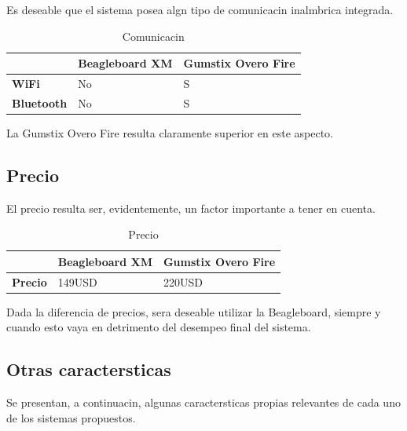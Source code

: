 \documentclass[spanish,12pt,a4paper,titlepage]{report}
\begin{document}
Es deseable que el sistema posea algn tipo de comunicacin inalmbrica integrada.

\begin{table}[H]
\begin{tabular}{p{130pt}|p{130pt}|p{130pt}|} 
\cline{2-3}
& \cellcolor[gray]{0.8} \textbf{Beagleboard XM} 
& \cellcolor[gray]{0.8} \textbf{Gumstix Overo Fire} \\ \cline{1-3} \hline
\multicolumn{1}{|p{130pt}|}{\cellcolor[gray]{0.8}\textbf{WiFi}} 
&No &S\\ 
\hline 
\multicolumn{1}{|p{130pt}|}{\cellcolor[gray]{0.8}\textbf{Bluetooth}} 
&No &S\\
\hline
\end{tabular}
\caption{Comunicacin}
\label{tab:comunicacion}
\end{table}

La Gumstix Overo Fire resulta claramente superior en este aspecto.

\subsection*{Precio}

El precio resulta ser, evidentemente, un factor importante a tener en cuenta.

\begin{table}[H]
\begin{tabular}{p{130pt}|p{130pt}|p{130pt}|} 
\cline{2-3}
& \cellcolor[gray]{0.8} \textbf{Beagleboard XM} 
& \cellcolor[gray]{0.8} \textbf{Gumstix Overo Fire} \\ \cline{1-3} \hline
\multicolumn{1}{|p{130pt}|}{\cellcolor[gray]{0.8}\textbf{Precio}} 
&149USD &220USD\\ 
\hline 
\end{tabular}
\caption{Precio}
\label{tab:precio}
\end{table}

Dada la diferencia de precios, sera deseable utilizar la Beagleboard, siempre y cuando esto vaya en detrimento del desempeo final del sistema.

\subsection*{Otras caractersticas}

Se presentan, a continuacin, algunas caractersticas propias relevantes de cada uno de los sistemas propuestos.
\end{document}
